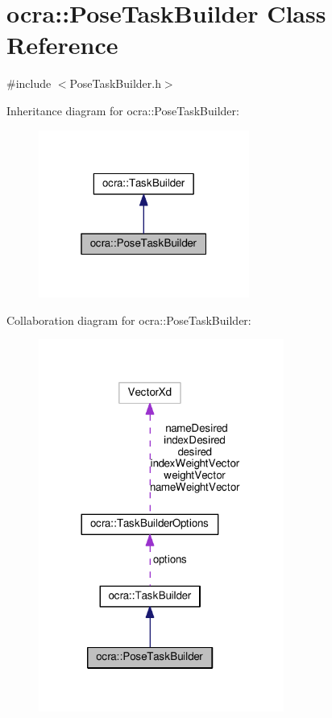 \hypertarget{classocra_1_1PoseTaskBuilder}{}\section{ocra\+:\+:Pose\+Task\+Builder Class Reference}
\label{classocra_1_1PoseTaskBuilder}


{\ttfamily \#include $<$Pose\+Task\+Builder.\+h$>$}



Inheritance diagram for ocra\+:\+:Pose\+Task\+Builder\+:
\nopagebreak
\begin{figure}[H]
\begin{center}
\leavevmode
\includegraphics[width=196pt]{da/d70/classocra_1_1PoseTaskBuilder__inherit__graph}
\end{center}
\end{figure}


Collaboration diagram for ocra\+:\+:Pose\+Task\+Builder\+:
\nopagebreak
\begin{figure}[H]
\begin{center}
\leavevmode
\includegraphics[width=228pt]{d0/d22/classocra_1_1PoseTaskBuilder__coll__graph}
\end{center}
\end{figure}
